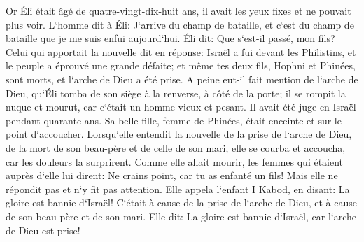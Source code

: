 \verse Or Éli était âgé de quatre-vingt-dix-huit ans, il avait les yeux fixes et ne pouvait plus voir. 
\verse L`homme dit à Éli: J`arrive du champ de bataille, et c`est du champ de bataille que je me suis enfui aujourd`hui. Éli dit: Que s`est-il passé, mon fils? 
\verse Celui qui apportait la nouvelle dit en réponse: Israël a fui devant les Philistins, et le peuple a éprouvé une grande défaite; et même tes deux fils, Hophni et Phinées, sont morts, et l`arche de Dieu a été prise. 
\verse A peine eut-il fait mention de l`arche de Dieu, qu`Éli tomba de son siège à la renverse, à côté de la porte; il se rompit la nuque et mourut, car c`était un homme vieux et pesant. Il avait été juge en Israël pendant quarante ans. 
\verse Sa belle-fille, femme de Phinées, était enceinte et sur le point d`accoucher. Lorsqu`elle entendit la nouvelle de la prise de l`arche de Dieu, de la mort de son beau-père et de celle de son mari, elle se courba et accoucha, car les douleurs la surprirent. 
\verse Comme elle allait mourir, les femmes qui étaient auprès d`elle lui dirent: Ne crains point, car tu as enfanté un fils! Mais elle ne répondit pas et n`y fit pas attention. 
\verse Elle appela l`enfant I Kabod, en disant: La gloire est bannie d`Israël! C`était à cause de la prise de l`arche de Dieu, et à cause de son beau-père et de son mari. 
\verse Elle dit: La gloire est bannie d`Israël, car l`arche de Dieu est prise! 

